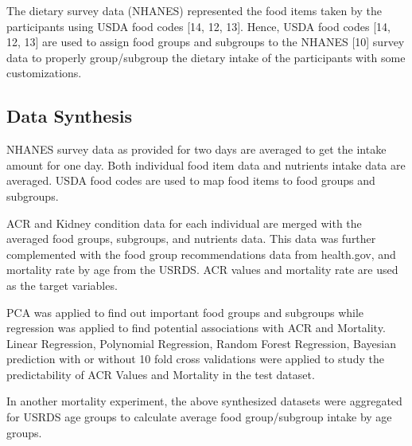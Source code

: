 \medskip
\noindent The dietary survey data (NHANES) represented the food items taken by the participants using USDA food codes [14, 12, 13]. Hence, USDA food codes [14, 12, 13] are used to assign food groups and subgroups to the NHANES [10] survey data to properly group/subgroup the dietary intake of the participants with some customizations.

\subsection{Data Synthesis}
\noindent NHANES survey data as provided for two days are averaged to get the intake amount for one day. Both individual food item data and nutrients intake data are averaged. USDA food codes are used to map food items to food groups and subgroups.

\noindent ACR and Kidney condition data for each individual are merged with the averaged food groups, subgroups, and nutrients data. This data was further complemented with the food group recommendations data from health.gov, and mortality rate by age from the USRDS. ACR values and mortality rate  are used as the target variables.

\noindent PCA was applied to find out important food groups and subgroups while regression was applied to find potential associations with ACR and Mortality. Linear Regression, Polynomial Regression, Random Forest Regression, Bayesian prediction with or without 10 fold cross validations were applied to study the predictability of ACR Values and Mortality in the test dataset. 

\noindent In another mortality experiment, the above synthesized datasets were aggregated for USRDS age  groups to calculate average food group/subgroup intake by age groups. 
